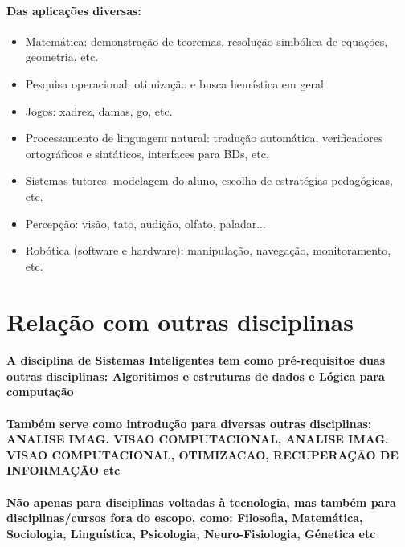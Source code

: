 \documentclass{article}
\begin{document}
\paragraph{Das aplicações diversas:}
\begin{itemize}
    \item Matemática: demonstração de teoremas, resolução simbólica de equações, geometria, etc.
    
    \item Pesquisa operacional: otimização e busca heurística em geral
    
    \item Jogos: xadrez, damas, go, etc.
    
    \item Processamento de linguagem natural: tradução automática, verificadores ortográficos e sintáticos, interfaces para BDs, etc.
    
    \item Sistemas tutores: modelagem do aluno, escolha de estratégias pedagógicas, etc.
    
    \item Percepção: visão, tato, audição, olfato, paladar...
    
    \item Robótica (software e hardware): manipulação, navegação, monitoramento, etc.
\end{itemize}

\section{Relação com outras disciplinas}

\paragraph{A disciplina de Sistemas Inteligentes tem como pré-requisitos duas outras disciplinas: Algoritimos e estruturas de dados e Lógica para computação}

\paragraph{Também serve como introdução para diversas outras disciplinas: ANALISE IMAG. VISAO COMPUTACIONAL, ANALISE IMAG. VISAO COMPUTACIONAL, OTIMIZACAO, RECUPERAÇÃO DE INFORMAÇÃO etc}

\paragraph{Não apenas para disciplinas voltadas à tecnologia, mas também para disciplinas/cursos fora do escopo, como: Filosofia, Matemática, Sociologia, Linguística, Psicologia, Neuro-Fisiologia, Génetica etc}
\end{document}
